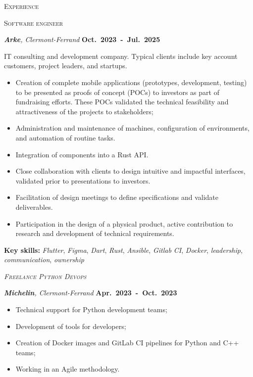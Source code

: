 \documentclass[10pt, a4paper]{article}
\newcommand{\dates}[1]{\hfill\mbox{\textbf{#1}}}
\newcommand{\headright}[1]{\vspace*{2.5ex}\textsc{\Large\color{accent}#1}\par%
     \vspace*{-2ex}{\color{accent}\hrulefill}\par}
\begin{document}
\begin{minipage}[t]{0.56\textwidth}
\setlength{\parskip}{0.8ex}%

\vspace{2ex}

\headright{Experience}

\textsc{Software engineer}

\textit{\textbf{Arke}, Clermont-Ferrand}  \dates{Oct. 2023 - Jul. 2025}

{\small
IT consulting and development company. Typical clients include key account customers, project leaders, and startups.

\begin{itemize}
    \item Creation of complete mobile applications (prototypes, development, testing) to be presented as proofs of concept (POCs) to investors as part of fundraising efforts. These POCs validated the technical feasibility and attractiveness of the projects to stakeholders;
    \item Administration and maintenance of machines, configuration of environments, and automation of routine tasks.
    \item Integration of components into a Rust API.
    \item Close collaboration with clients to design intuitive and impactful interfaces, validated prior to presentations to investors.
    \item Facilitation of design meetings to define specifications and validate deliverables.
    \item Participation in the design of a physical product, active contribution to research and development of technical requirements.
\end{itemize}

\textbf{Key skills:} \emph{Flutter}, \emph{Figma}, \emph{Dart}, \emph{Rust}, \emph{Ansible}, \emph{Gitlab CI}, \emph{Docker}, \emph{leadership}, \emph{communication}, \emph{ownership}
}

\medskip

\textsc{\emph{Freelance Python Devops}}

\textit{\textbf{Michelin}, Clermont-Ferrand} \dates{Apr. 2023 - Oct. 2023}

{\small

\begin{itemize}
    \item Technical support for Python development teams;
    \item Development of tools for developers;
    \item Creation of Docker images and GitLab CI pipelines for Python and C++ teams;
    \item Working in an Agile methodology.
\end{itemize}

}
\end{minipage}
\end{document}
